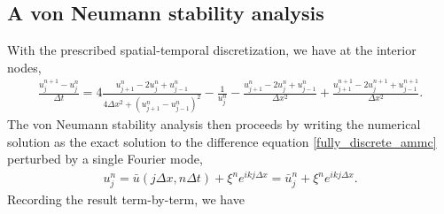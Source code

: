 \subsection{A von Neumann stability analysis}
With the prescribed spatial-temporal discretization, we have at the interior nodes,
\begin{align}
\frac{u^{n+1}_j - u^n_j}{\Delta t}
= 4\frac{u^n_{j+1} - 2u^n_j + u^n_{j-1}}{4\Delta x^2 + (u^n_{j+1} - u^n_{j-1})^2}
- \frac{1}{u^n_j} 
- \frac{u^n_{j+1} - 2u^n_j + u^n_{j-1}}{\Delta x^2} 
+ \frac{u^{n+1}_{j+1} - 2u^{n+1}_j + u^{n+1}_{j-1}}{\Delta x^2}.
\label{fully_discrete_ammc}
\end{align} 
The von Neumann stability analysis then proceeds by writing the numerical solution as the exact solution to the difference equation \eqref{fully_discrete_ammc} perturbed by a single Fourier mode, 
\begin{align}
u^n_j = \bar u(j\Delta x, n\Delta t) 
+ \xi^n e^{ikj\Delta x}
= \bar u^n_j + \xi^n e^{ikj\Delta x}.
\end{align}
Recording the result term-by-term, we have 
